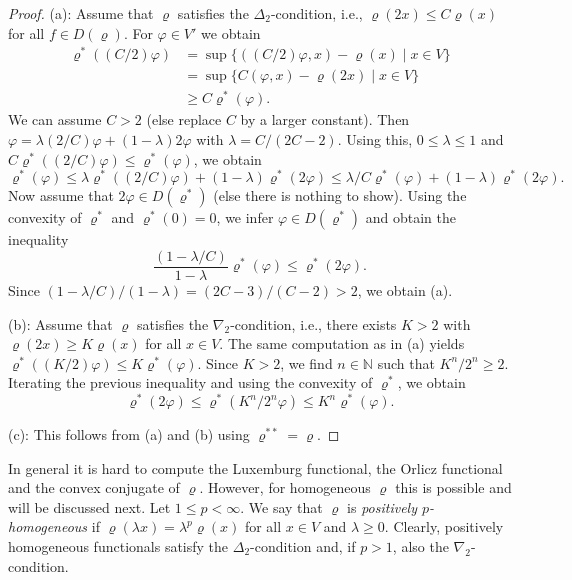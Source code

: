 \documentclass[a4paper,11pt,reqno]{amsart}
\theoremstyle{definition}
\numberwithin{equation}{section}
\newcommand{\N}{{\mathbb N}}
\newcommand{\vr}{{\varrho}}
\newcommand{\1}{\mathds{1}}
\begin{document}
\begin{proof}
 (a): Assume that $\vr$ satisfies the $\Delta_2$-condition, i.e., $\vr(2x) \leq C \vr(x)$ for all $f \in D(\vr)$. For $\varphi \in V'$ we obtain 
 \begin{align*}
 \vr^*((C/2)\varphi) &= \sup \{ ((C/2)\varphi, x) - \vr(x) \mid x \in V\}\\
 &= \sup \{ C(\varphi, x) - \vr(2x) \mid x \in V\}  \\
  &\geq C \vr^*(\varphi).
 \end{align*}
We can assume $C  > 2$  (else replace $C$ by a larger constant).  Then $\varphi = \lambda (2/C) \varphi  + (1-\lambda)2\varphi$ with $\lambda = C /(2C -2)$. Using this, $0 \leq \lambda \leq 1$ and $C \vr^*((2/C)\varphi) \leq \vr^*(\varphi)$, we obtain 
 $$\vr^*(\varphi) \leq \lambda \vr^*((2/C)\varphi) + (1-\lambda) \vr^*(2\varphi) \leq \lambda/C \vr^*(\varphi) + (1-\lambda)\vr^*(2 \varphi).$$
 Now assume that $2\varphi \in D(\vr^*)$ (else there is nothing to show). Using the convexity of $\vr^*$ and $\vr^*(0) = 0$,  we infer $\varphi \in D(\vr^*)$ and obtain the inequality 
 $$\frac{(1 - \lambda/C)}{1-\lambda} \vr^*(\varphi) \leq \vr^*(2\varphi).$$
 Since $(1 - \lambda/C)/(1-\lambda)  = (2C - 3)/(C-2) > 2$, we obtain (a).  
 
 
 (b): Assume that $\vr$ satisfies the $\nabla_2$-condition, i.e., there exists $K  > 2$ with $\vr(2x) \geq K \vr(x)$ for all $x \in V$.   The same computation as in (a) yields $\vr^*((K/2) \varphi) \leq K \vr^*(\varphi)$. Since $K > 2$, we find $n \in \N$ such that $K^n /2^n \geq 2$. Iterating the previous inequality and using the convexity of $\vr^*$, we obtain 
 $$\vr^*(2 \varphi) \leq \vr^*(K^n/2^n \varphi) \leq K^n \vr^*(\varphi). $$
 
 (c): This follows from (a) and (b) using $\vr^{**} = \vr$.
\end{proof}

 
 
  
  
  In general it is hard to compute the Luxemburg functional, the Orlicz functional and the convex conjugate of $\vr$. However, for homogeneous $\vr$ this is possible  and will be discussed next.   Let $1 \leq p <  \infty$. We say that $\vr$ is {\em positively $p$-homogeneous} if $\vr(\lambda x) = \lambda^p \vr(x)$ for all $x \in V$ and $\lambda \geq 0$.   Clearly, positively homogeneous functionals satisfy the $\Delta_2$-condition and, if $p > 1$, also the $\nabla_2$-condition. 
  
\end{document}
